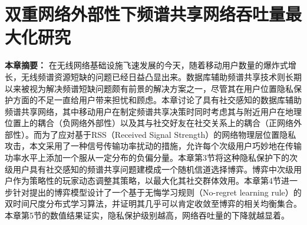 \chapter{双重网络外部性下频谱共享网络吞吐量最大化研究}
\textbf{本章摘要：} 
在无线网络基础设施飞速发展的今天，随着移动用户数量的爆炸式增长，无线频谱资源短缺的问题已经日益凸显出来。数据库辅助频谱共享技术则长期以来被视为解决频谱短缺问题颇有前景的解决方案之一，尽管其在用户位置隐私保护方面的不足一直给用户带来担忧和顾虑。本章讨论了具有社交感知的数据库辅助频谱共享网络，其中移动用户在制定频谱共享决策时同时考虑其与附近用户在地理位置上的耦合（负网络外部性）以及其与社交好友在社交关系上的耦合（正网络外部性）。而为了应对基于RSS（Received Signal Strength）的网络物理层位置隐私攻击，本文采用了一种信号传输功率扰动的措施，允许每个次级用户巧妙地在传输功率水平上添加一个服从一定分布的负偏分量。本章第3节将这种隐私保护下的次级用户具有社交感知的频谱共享问题建模成一个随机信道选择博弈。博弈中次级用户作为策略性的玩家动态调整其策略，以最大化其社交群体效用。本章第4节进一步针对提出的博弈模型设计了一个基于无悔学习规则（No-regret learning rule）的双时间尺度分布式学习算法，并证明其几乎可以肯定收敛至博弈的相关均衡集合。本章第5节的数值结果证实，隐私保护级别越高，网络吞吐量的下降就越显着。


